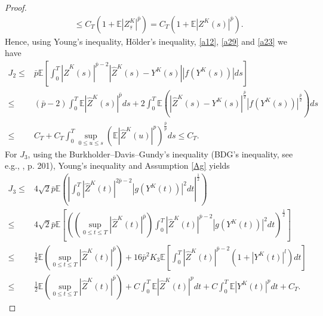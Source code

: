 \documentclass[preprint,12pt,compress]{elsarticle}
\begin{document}
\begin{proof}
\begin{equation}
\begin{split}
	&\le {C_T}\left( {1 + \mathbb{E}{{\left| Z_{{\underline{s}}}^K \right|}^{\bar p}}} \right) 
	= {C_T}\left( {1 + \mathbb{E}{{\left| {{Z^K}(s)} \right|}^{\bar p}}} \right) .
\end{split}
\end{equation}
Hence, using Young's inequality, H\"older's inequality, \eqref{a12}, \eqref{a29} and \eqref{a23} we have
\begin{equation}   \label{J21}
	\begin{split}
		J_2
		\le& \bar p\mathbb{E}\left[ {\int_0^T {{{\left| {{{\hat Z}^K}(s)} \right|}^{\bar p - 2}}\left| {{{\hat Z}^K}(s) - {Y^K}(s)} \right|\left| {f({Y^K}(s))} \right|ds} } \right] \\
		\le& (\bar p - 2)\int_0^T {\mathbb{E}{{\left| {{{\hat Z}^K}(s)} \right|}^{\bar p}}ds}  + 2\int_0^T {\mathbb{E}\left( {{{\left| {{{\hat Z}^K}(s) - {Y^K}(s)} \right|}^{\frac{{\bar p}}{2}}}{{\left| {f({Y^K}(s))} \right|}^{\frac{{\bar p}}{2}}}} \right)ds}  \\
		\le& {C_T} + {C_T}\int_0^T {\mathop {\sup }\limits_{0 \le u \le s} {{\left( {\mathbb{E}{{\left| {{{\hat Z}^K}(u)} \right|}^p}} \right)}^{\frac{{\bar p}}{p}}}ds}  \le C_T.
	\end{split}
\end{equation}
For $J_3$, using the Burkholder--Davis--Gundy's inequality (BDG's inequality, see e.g., \cite[Theorem 1.7.3]{klebaner2012introduction}, p. 201), Young's inequality and Assumption \ref{Ag} yields
\begin{equation}  \label{J31}
\begin{split}
	J_3 
	\le& 4\sqrt 2 \bar p\mathbb{E}\left( {{{\left| {\int_0^T {{{\left| {{{\hat Z}^K}(t)} \right|}^{2\bar p - 2}}{{\left| {g({Y^K}(t))} \right|}^2}dt} } \right|}^{\frac{1}{2}}}} \right) \\
	\le& 4\sqrt 2 \bar p\mathbb{E}\left[ {{{\left( {\left( {\mathop {\sup }\limits_{0 \le t \le T} {{\left| {{{\hat Z}^K}(t)} \right|}^{\bar p}}} \right)\int_0^T {{{\left| {{{\hat Z}^K}(t)} \right|}^{\bar p - 2}}{{\left| {g({Y^K}(t))} \right|}^2}dt} } \right)}^{\frac{1}{2}}}} \right]  \\
	\le& \frac{1}{2}\mathbb{E}\left( {\mathop {\sup }\limits_{0 \le t \le T} {{\left| {{{\hat Z}^K}(t)} \right|}^{\bar p}}} \right) + 16{{\bar p}^2}{K_3}\mathbb{E}\left[ {\int_0^T {{{\left| {{{\hat Z}^K}(t)} \right|}^{\bar p - 2}}\left( {1 + {{\left| {{Y^K}(t)} \right|}^l}} \right)dt} } \right] \\
	\le& \frac{1}{2}\mathbb{E}\left( {\mathop {\sup }\limits_{0 \le t \le T} {{\left| {{{\hat Z}^K}(t)} \right|}^{\bar p}}} \right) + C\int_0^T {\mathbb{E}{{\left| {{{\hat Z}^K}(t)} \right|}^p}dt}  + C\int_0^T {\mathbb{E}{{\left| {{Y^K}(t)} \right|}^p}dt}  + {C_T} .

\end{split}
\end{equation}
\end{proof}
\end{document}
